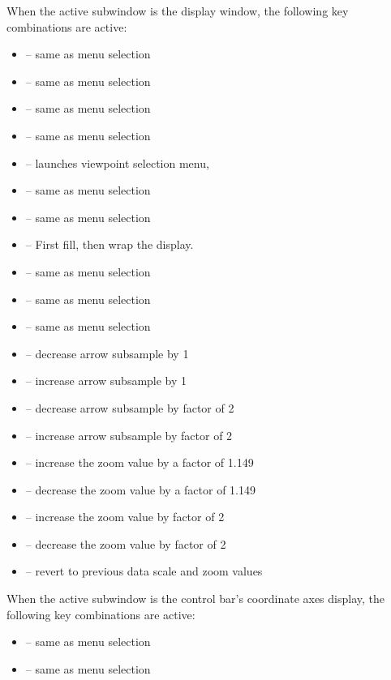 When the active subwindow is the display window, the following
key combinations are active:
\begin{itemize}
\item {} -- same as menu selection 
\item {} -- same as menu selection
                       {}
\item {} -- same as menu selection
                       {}
\item {} -- same as menu selection
\item {} -- launches viewpoint selection menu,
\item {} -- same as menu selection {}
\item {} -- same as menu selection {}
\item {} -- First fill, then wrap the display.
\item {} --
 same as menu selection {}
\item {} -- same as menu selection 
\item {} -- same as menu selection 
\item {} -- decrease arrow subsample by 1
\item {} -- increase arrow subsample by 1
\item {} -- decrease arrow subsample by factor of 2
\item {} -- increase arrow subsample by factor of 2
\item {} -- increase the zoom value by a factor of 1.149
\item {} -- decrease the zoom value by a factor of 1.149
\item {} -- increase the zoom value by factor of 2
\item {} -- decrease the zoom value by factor of 2
\item {} -- revert to previous data scale and zoom values
\end{itemize}

When the active subwindow is the control bar's coordinate axes display,
the following key combinations are active:
\begin{itemize}
\item {} -- same as menu selection 
\item {} -- same as menu selection 
\end{itemize}

